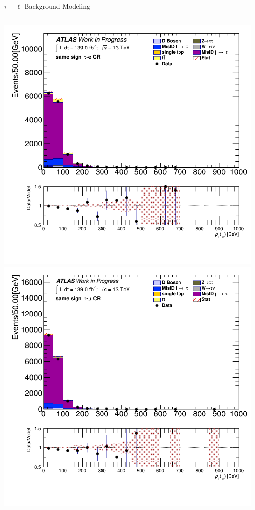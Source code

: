\documentclass[aspectratio=169,xcolor=table]{beamer}
\begin{document}
\begin{frame}[t]{$\tau+\ell$ Background Modeling}
\begin{columns}[t]
          \includegraphics[height=.45\textheight,keepaspectratio=true]{taulep_1p_3p/v09/lep_0_pt_SS_TAUEL.png}
          \includegraphics[height=.45\textheight,keepaspectratio=true]{taulep_1p_3p/v09/lep_0_pt_SS_TAUMU.png}

        \end{columns}
      \end{frame}
\end{document}
